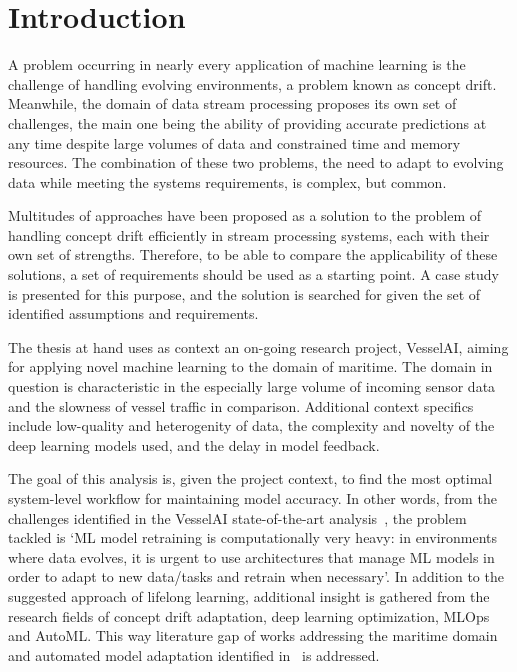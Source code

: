 \chapter{Introduction}
A problem occurring in nearly every application of machine learning is the challenge of handling evolving environments, a problem known as concept drift. Meanwhile, the domain of data stream processing proposes its own set of challenges, the main one being the ability of providing accurate predictions at any time despite large volumes of data and constrained time and memory resources. The combination of these two problems, the need to adapt to evolving data while meeting the systems requirements, is complex, but common.

Multitudes of approaches have been proposed as a solution to the problem of handling concept drift efficiently in stream processing systems, each with their own set of strengths. Therefore, to be able to compare the applicability of these solutions, a set of requirements should be used as a starting point. A case study is presented for this purpose, and the solution is searched for given the set of identified assumptions and requirements. 

The thesis at hand uses as context an on-going research project, VesselAI, aiming for applying novel machine learning to the domain of maritime. The domain in question is characteristic in the especially large volume of incoming sensor data and the slowness of vessel traffic in comparison. Additional context specifics include low-quality and heterogenity of data, the complexity and novelty of the deep learning models used, and the delay in model feedback. 

The goal of this analysis is, given the project context, to find the most optimal system-level workflow for maintaining model accuracy. In other words, from the challenges identified in the VesselAI state-of-the-art analysis~\cite{D1.1}, the problem tackled is `ML model retraining is computationally very heavy: in environments where data evolves, it is urgent to use architectures that manage ML models in order to adapt to new data/tasks and retrain when necessary'. In addition to the suggested approach of lifelong learning, additional insight is gathered from the research fields of concept drift adaptation, deep learning optimization, MLOps and AutoML. This way literature gap of works addressing the maritime domain and automated model adaptation identified in~\cite{D1.1} is addressed.   

